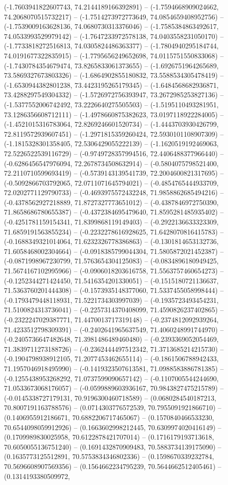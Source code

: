 (-1.7603941822607743, 74.2144189166392891) -- (-1.7594668909024662, 74.2068070515732217) -- (-1.7514273972773649, 74.0854659408952756) -- (-1.7539009163628136, 74.0680730313376046) -- (-1.7585384863492617, 74.0533993529979142) -- (-1.7647233972578138, 74.0403558231050170) -- (-1.7733818272516813, 74.0305824486363377) -- (-1.7804940295184744, 74.0191677322835915) -- (-1.7795656249652698, 74.0115751550833068) -- (-1.7430784354679474, 73.8265833061373655) -- (-1.6926751964265689, 73.5869327673803326) -- (-1.6864902855180832, 73.5588534305478419) -- (-1.6530944382801238, 73.4423195265179345) -- (-1.6484568682936871, 73.4288297549304332) -- (-1.5726972756393947, 73.2672985253827136) -- (-1.5377552006742492, 73.2226640275505503) -- (-1.5195110493281951, 73.1286356608712111) -- (-1.4978660875382623, 73.0197118922284005) -- (-1.4521015316783064, 72.8269246601520734) -- (-1.4443703930426799, 72.8119572939607451) -- (-1.2971815359260424, 72.5930101108907309) -- (-1.1815328301358405, 72.5306429055222139) -- (-1.1620519192469063, 72.5226522539116729) -- (-0.9749728357994516, 72.4406488377966440) -- (-0.6286456547976094, 72.2678734508632914) -- (-0.5804075798521400, 72.2110710599693419) -- (-0.5739143139541739, 72.2004600821317695) -- (-0.5092866703792065, 72.0711071645794021) -- (-0.4854765444933709, 72.0202771129790733) -- (-0.4693975572432248, 71.9858862685494216) -- (-0.4378562927218889, 71.8727327773651012) -- (-0.4387846972750390, 71.8658686780655387) -- (-0.4372384695479640, 71.8595281485935402) -- (-0.4251781159154341, 71.8399868119149403) -- (-0.2922136633323309, 71.6859191563855234) -- (-0.2232278616928625, 71.6428070816415783) -- (-0.1688349321014064, 71.6232326778386863) -- (-0.1301814653132736, 71.6058468002304664) -- (-0.0918385799044304, 71.5805872021452387) -- (-0.0871998967230799, 71.5763654304125083) -- (-0.0834896180949425, 71.5674167102995966) -- (-0.0906018203616758, 71.5563757460654273) -- (-0.1252344271424450, 71.5416354201330051) -- (-0.1515180721136637, 71.5363760201444308) -- (-0.1573935148377060, 71.5337455058998444) -- (-0.1793479448118931, 71.5221734303997039) -- (-0.1935723493454231, 71.5100824313736041) -- (-0.2257314370408099, 71.4590826237402865) -- (-0.2322247029387771, 71.4470013717319148) -- (-0.2374812092939264, 71.4233512798309391) -- (-0.2402641965637549, 71.4060248991744970) -- (-0.2405736647482648, 71.3981486489460480) -- (-0.2393369052054469, 71.3839711273188726) -- (-0.2362444497512342, 71.3713685214215730) -- (-0.1904798938912105, 71.2077453462655114) -- (-0.1861506788942433, 71.1957046918495990) -- (-0.1419323507613581, 71.0988583886781385) -- (-0.1255438953268292, 71.0737599090657142) -- (-0.1107005544244690, 71.0533673068176057) -- (-0.0599889603936167, 70.9843827475215789) -- (-0.0145338727179131, 70.9196300460718589) -- (0.0680284540187213, 70.8007191163788576) -- (0.0714303776572539, 70.7955091921866710) -- (0.1406955912186671, 70.6882206717465067) -- (0.1570840466533230, 70.6544098059912926) -- (0.1663602998212445, 70.6309974020416149) -- (0.1709989830025958, 70.6122878421707014) -- (0.1716179193713618, 70.6050055136751240) -- (0.1691432870909483, 70.5883734139175090) -- (0.1635773125512891, 70.5753834346802336) -- (0.1598670339232784, 70.5696608907569356) -- (0.1564662234795239, 70.5644662512405461) -- (0.1314193380509972, 